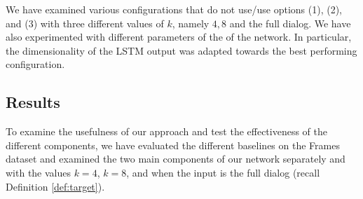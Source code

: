 We have examined various configurations that do not use/use options 
(1), (2), and (3) with three different values of $k$, namely $4,8$ and 
the full dialog. 
We have also experimented with different parameters of the of the network. 
In particular, the dimensionality of the LSTM output was adapted towards 
the best performing configuration.




\subsection{Results}
To examine the usefulness of our approach and 
test the effectiveness of the different components, 
we have evaluated the different baselines on the Frames 
dataset \cite{frames} and examined the two main components of our network separately 
and with the values $k=4$, $k=8$, and when the input is the full dialog (recall Definition \ref{def:target}). 

